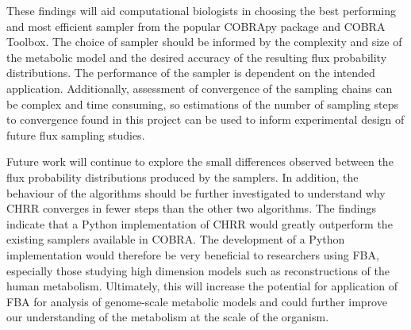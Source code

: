 \documentclass[10pt,letterpaper]{article}
\begin{document}
These findings will aid computational biologists in choosing the best performing and most efficient sampler from the popular COBRApy package and COBRA Toolbox. The choice of sampler should be informed by the complexity and size of the metabolic model and the desired accuracy of the resulting flux probability distributions. The performance of the sampler is dependent on the intended application. Additionally, assessment of convergence of the sampling chains can be complex and time consuming, so estimations of the number of sampling steps to convergence found in this project can be used to inform experimental design of future flux sampling studies. 

Future work will continue to explore the small differences observed between the flux probability distributions produced by the samplers. In addition, the behaviour of the algorithms should be further investigated to understand why CHRR converges in fewer steps than the other two algorithms. The findings indicate that a Python implementation of CHRR would greatly outperform the existing samplers available in COBRA. The development of a Python implementation would therefore be very beneficial to researchers using FBA, especially those studying high dimension models such as reconstructions of the human metabolism. Ultimately, this will increase the potential for application of FBA for analysis of genome-scale metabolic models and could further improve our understanding of the metabolism at the scale of the organism. 




\end{document}
